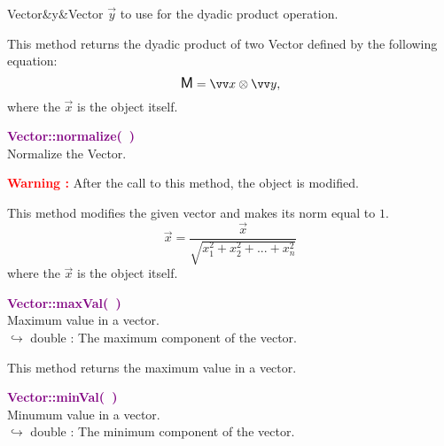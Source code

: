 \begin{tcolorbox}[width=\textwidth,myArgs,tabularx={ll|R}]
Vector&y&Vector $\overrightarrow{y}$ to use for the dyadic product operation.
\end{tcolorbox}

This method returns the dyadic product of two Vector defined by the following equation:
\begin{equation*}
\M = \overrightarrow{x}\otimes\overrightarrow{y},
\end{equation*}
where the $\overrightarrow{x}$ is the object itself.

\textcolor{purple}{\textbf{Vector::normalize(~)}}\label{Vector::normalize()}\\
Normalize the Vector.

\hspace*{10mm}\textcolor{red}{\textbf{Warning :}} After the call to this method, the object is modified.

This method modifies the given vector and makes its norm equal to $1$.
\begin{equation*}
\overrightarrow{x} = \frac{\overrightarrow{x}}{\sqrt {x_{1}^2 + x_{2}^2 + ... + x_{n}^2}}
\end{equation*}
where the $\overrightarrow{x}$ is the object itself.

\textcolor{purple}{\textbf{Vector::maxVal(~)}}\label{Vector::maxVal()}\\
Maximum value in a vector.\\ \hspace*{10mm}$\hookrightarrow$ double : The maximum component of the vector.

This method returns the maximum value in a vector.

\textcolor{purple}{\textbf{Vector::minVal(~)}}\label{Vector::minVal()}\\
Minumum value in a vector.\\ \hspace*{10mm}$\hookrightarrow$ double : The minimum component of the vector.

